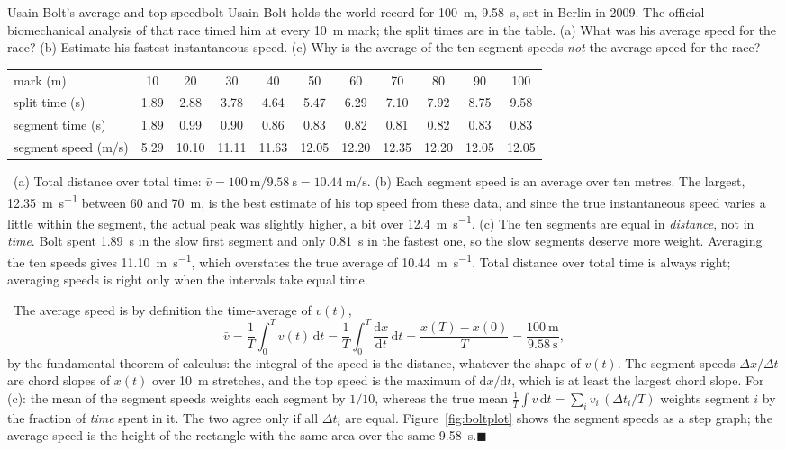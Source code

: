 \documentclass[11pt,twoside,openany]{book}
\newcommand{\dd}{\mathrm{d}}
\newcommand{\deriv}[2]{\frac{\dd #1}{\dd #2}}
\newcommand{\viewtag}[3]{\fcolorbox{#2}{#3}{\footnotesize\textbf{\textcolor{#2}{#1}}}}
\newcommand{\elemtag}{\viewtag{Elementary}{elemcol}{elempale}}
\newcommand{\calctag}{\viewtag{Calculus}{calccol}{calcpale}}
\newcommand{\elem}{\par\medskip\noindent\elemtag\ }
\newcommand{\calc}{\par\medskip\noindent\calctag\ }
\newcommand{\qed}{\hfill$\blacksquare$}
\begin{document}
\begin{example}{Usain Bolt's average and top speed}{bolt}
Usain Bolt holds the world record for \SI{100}{\metre}, \SI{9.58}{\second}, set in Berlin in 2009. The official biomechanical analysis of that race timed him at every \SI{10}{\metre} mark; the split times are in the table. (a) What was his average speed for the race? (b) Estimate his fastest instantaneous speed. (c) Why is the average of the ten segment speeds \emph{not} the average speed for the race?
\begin{center}
\renewcommand{\arraystretch}{1.15}
\small
\begin{tabular}{lcccccccccc}
\toprule
mark (m) & 10 & 20 & 30 & 40 & 50 & 60 & 70 & 80 & 90 & 100 \\
split time (s) & 1.89 & 2.88 & 3.78 & 4.64 & 5.47 & 6.29 & 7.10 & 7.92 & 8.75 & 9.58 \\
segment time (s) & 1.89 & 0.99 & 0.90 & 0.86 & 0.83 & 0.82 & 0.81 & 0.82 & 0.83 & 0.83 \\
segment speed (m/s) & 5.29 & 10.10 & 11.11 & 11.63 & 12.05 & 12.20 & 12.35 & 12.20 & 12.05 & 12.05 \\
\bottomrule
\end{tabular}
\end{center}

\elem (a) Total distance over total time: $\bar v = \SI{100}{\metre}/\SI{9.58}{\second} = \SI{10.44}{\metre\per\second}$. (b) Each segment speed is an average over ten metres. The largest, \SI{12.35}{\metre\per\second} between \num{60} and \SI{70}{\metre}, is the best estimate of his top speed from these data, and since the true instantaneous speed varies a little within the segment, the actual peak was slightly higher, a bit over \SI{12.4}{\metre\per\second}. (c) The ten segments are equal in \emph{distance}, not in \emph{time}. Bolt spent \SI{1.89}{\second} in the slow first segment and only \SI{0.81}{\second} in the fastest one, so the slow segments deserve more weight. Averaging the ten speeds gives \SI{11.10}{\metre\per\second}, which overstates the true average of \SI{10.44}{\metre\per\second}. Total distance over total time is always right; averaging speeds is right only when the intervals take equal time.

\calc The average speed is by definition the time-average of $v(t)$,
\[
\bar v = \frac{1}{T}\int_0^{T} v(t)\,\dd t = \frac{1}{T}\int_0^T \deriv{x}{t}\,\dd t = \frac{x(T) - x(0)}{T} = \frac{\SI{100}{\metre}}{\SI{9.58}{\second}},
\]
by the fundamental theorem of calculus: the integral of the speed is the distance, whatever the shape of $v(t)$. The segment speeds $\Delta x/\Delta t$ are chord slopes of $x(t)$ over \SI{10}{\metre} stretches, and the top speed is the maximum of $\dd x/\dd t$, which is at least the largest chord slope. For (c): the mean of the segment speeds weights each segment by $1/10$, whereas the true mean $\frac{1}{T}\int v\,\dd t = \sum_i v_i\,(\Delta t_i/T)$ weights segment $i$ by the fraction of \emph{time} spent in it. The two agree only if all $\Delta t_i$ are equal. Figure~\ref{fig:boltplot} shows the segment speeds as a step graph; the average speed is the height of the rectangle with the same area over the same \SI{9.58}{\second}.\qed
\end{example}
\end{document}
